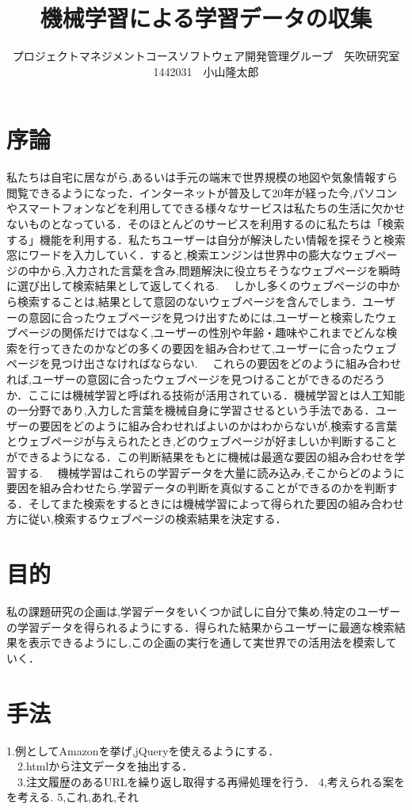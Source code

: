\documentclass[uplatex,twocolumn,dvipdfmx]{jsarticle}
\title{\vspace{-5mm}\fontsize{14pt}{0pt}\selectfont 機械学習による学習データの収集}
\author{\normalsize プロジェクトマネジメントコースソフトウェア開発管理グループ　矢吹研究室　1442031　小山隆太郎}
\date{}
\begin{document}
\fontsize{10.5pt}{\baselineskip}\selectfont
\maketitle





\section{序論}
私たちは自宅に居ながら,あるいは手元の端末で世界規模の地図や気象情報すら閲覧できるようになった．インターネットが普及して20年が経った今,パソコンやスマートフォンなどを利用してできる様々なサービスは私たちの生活に欠かせないものとなっている．そのほとんどのサービスを利用するのに私たちは「検索する」機能を利用する．私たちユーザーは自分が解決したい情報を探そうと検索窓にワードを入力していく．すると,検索エンジンは世界中の膨大なウェブページの中から,入力された言葉を含み,問題解決に役立ちそうなウェブページを瞬時に選び出して検索結果として返してくれる.\cite{KADOKAWA2015}
　しかし多くのウェブページの中から検索することは,結果として意図のないウェブページを含んでしまう．ユーザーの意図に合ったウェブページを見つけ出すためには,ユーザーと検索したウェブページの関係だけではなく,ユーザーの性別や年齢・趣味やこれまでどんな検索を行ってきたのかなどの多くの要因を組み合わせて,ユーザーに合ったウェブページを見つけ出さなければならない.\cite{GENTOSYA2014}
　これらの要因をどのように組み合わせれば,ユーザーの意図に合ったウェブページを見つけることができるのだろうか．ここには機械学習と呼ばれる技術が活用されている．機械学習とは人工知能の一分野であり,入力した言葉を機械自身に学習させるという手法である．ユーザーの要因をどのように組み合わせればよいのかはわからないが,検索する言葉とウェブページが与えられたとき,どのウェブページが好ましいか判断することができるようになる．この判断結果をもとに機械は最適な要因の組み合わせを学習する.\cite{SOTURON2015}
　機械学習はこれらの学習データを大量に読み込み,そこからどのように要因を組み合わせたら,学習データの判断を真似することができるのかを判断する．そしてまた検索をするときには機械学習によって得られた要因の組み合わせ方に従い,検索するウェブページの検索結果を決定する．


\section{目的}
私の課題研究の企画は,学習データをいくつか試しに自分で集め,特定のユーザーの学習データを得られるようにする．得られた結果からユーザーに最適な検索結果を表示できるようにし,この企画の実行を通して実世界での活用法を模索していく．


\section{手法}
1.例としてAmazonを挙げ,jQueryを使えるようにする．\\
　2.htmlから注文データを抽出する．\\
　3.注文履歴のあるURLを繰り返し取得する再帰処理を行う．
  4,考えられる案をを考える.
  5,これ,あれ,それ


\end{document}
